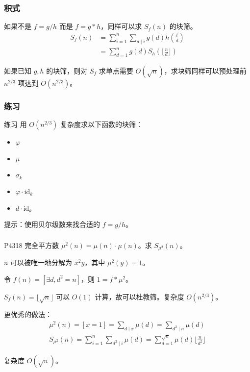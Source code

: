\documentclass[../main.tex]{subfiles}
\begin{document}
\subsubsection{积式}

\begin{frame}
如果不是 $f=g/h$ 而是 $f=g*h$，同样可以求 $S_f(n)$ 的块筛。\pause
$$
\begin{aligned}
S_f(n)&=\sum_{i=1}^n\sum_{d\mid i}g(d)h(\frac{i}{d})\\
&=\sum_{d=1}^ng(d)S_h(\lfloor\frac{n}{d}\rfloor)
\end{aligned}
$$\pause

如果已知 $g,h$ 的块筛，则对 $S_f$ 求单点需要 $O(\sqrt n)$，求块筛同样可以预处理前 $n^{2/3}$ 项达到 $O(n^{2/3})$。
\end{frame}

\subsubsection{练习}

\begin{frame}{练习}
用 $O(n^{2/3})$ 复杂度求以下函数的块筛：

\begin{itemize}
\item $\varphi$
\item $\mu$
\item $\sigma_k$
\item $\varphi\cdot \text{id}_k$
\item $d\cdot \text{id}_k$
\end{itemize} \pause

提示：使用贝尔级数来找合适的 $f=g/h$。
\end{frame}

\subsubsection{}

\begin{frame}{P4318 完全平方数}
$\mu^2(n)=\mu(n)\cdot\mu(n)$。求 $S_{\mu^2}(n)$。\pause
\bigskip

$n$ 可以被唯一地分解为 $x^2y$，其中 $\mu^2(y)=1$。\pause

令 $f(n)=[\exists d,d^2=n]$，则 $1=f*\mu^2$。\pause

$S_f(n)=\lfloor \sqrt n\rfloor$ 可以 $O(1)$ 计算，故可以杜教筛。复杂度 $O(n^{2/3})$。
\end{frame}

\begin{frame}
更优秀的做法：
$$
\begin{aligned}
\mu^2(n)=[x=1]=\sum_{d\mid x}\mu(d)=\sum_{d^2\mid n}\mu(d)\\
S_{\mu^2}(n)=\sum_{i=1}^n\sum_{d^2\mid i}\mu(d)=\sum_{d=1}^{\sqrt{n}}\mu(d)\lfloor\frac{n}{d^2}\rfloor
\end{aligned}
$$\pause

复杂度 $O(\sqrt n)$。
\end{frame}
\end{document}

